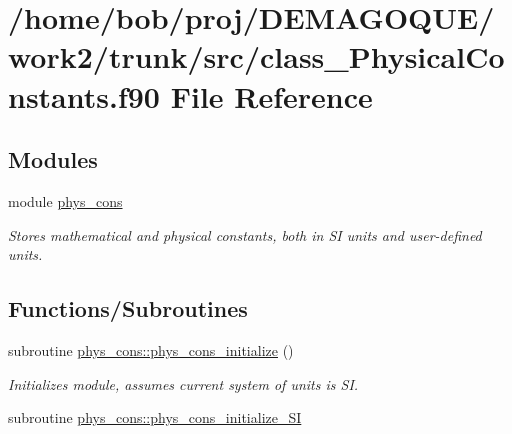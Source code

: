\hypertarget{class__PhysicalConstants_8f90}{
\section{/home/bob/proj/DEMAGOQUE/work2/trunk/src/class\_\-PhysicalConstants.f90 File Reference}
\label{class__PhysicalConstants_8f90}
}
\subsection*{Modules}
\begin{DoxyCompactItemize}
\item 
module \hyperlink{namespacephys__cons}{phys\_\-cons}


\begin{DoxyCompactList}\small\item\em Stores mathematical and physical constants, both in SI units and user-\/defined units. \item\end{DoxyCompactList}

\end{DoxyCompactItemize}
\subsection*{Functions/Subroutines}
\begin{DoxyCompactItemize}
\item 
subroutine \hyperlink{namespacephys__cons_a2197fe7eff35572113dcf41a6493794c}{phys\_\-cons::phys\_\-cons\_\-initialize} ()
\begin{DoxyCompactList}\small\item\em Initializes module, assumes current system of units is SI. \item\end{DoxyCompactList}\item 
subroutine \hyperlink{namespacephys__cons_abfc9a7567c3e76fdbbad91b88b46426e}{phys\_\-cons::phys\_\-cons\_\-initialize\_\-SI}
\end{DoxyCompactItemize}

